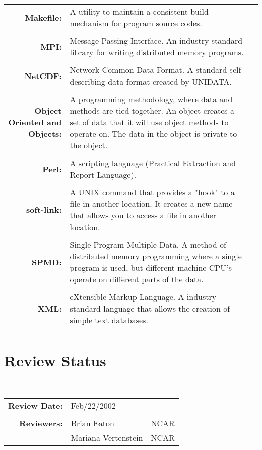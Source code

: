 \documentclass[]{article}
\begin{document}
\begin{tabular}{r p{1.3in} p{2in}}
{\bf Makefile:} & A utility to maintain a consistent build mechanism for program
source codes. \\ \\

{\bf MPI:} & Message Passing Interface. An industry standard library for writing
distributed memory programs. \\ \\

{\bf NetCDF:} & Network Common Data Format. A standard self-describing data format
created by UNIDATA. \\ \\

{\bf Object Oriented and Objects:} & A programming methodology, where data and methods
are tied together. An object creates a set of data that it will use object methods to
operate on. The data in the object is private to the object. \\ \\

{\bf Perl:} & A scripting language (Practical Extraction and Report Language). \\ \\

{\bf soft-link:} & A UNIX command that provides a "hook" to a file in another location.
It creates a new name that allows you to access a file in another location. \\ \\

{\bf SPMD:} & Single Program Multiple Data. A method of distributed memory programming
where a single program is used, but different machine CPU's operate on different parts
of the data. \\ \\

{\bf XML:} & eXtensible Markup Language. A industry standard language that allows the
creation of simple text databases. \\ \\

\end{tabular}

\section{Review Status}

 \\

\begin{tabular}{r p{1.3in} p{2in}}
{\bf Review Date:} & Feb/22/2002 \\ \\
{\bf Reviewers:}   & Brian Eaton         & NCAR \\
                   & Mariana Vertenstein & NCAR
\end{tabular}
\end{document}
